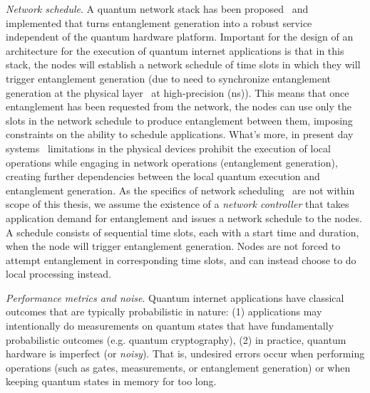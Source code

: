 \textit{Network schedule}.
A quantum network stack has been proposed~\cite{dahlberg2019link} and implemented \cite{pompili2022experimental} that turns entanglement generation into a robust service independent of the quantum hardware platform.
Important for the design of an architecture for the execution of quantum internet applications is that in this stack, the nodes will establish a network schedule of time slots in which they will trigger entanglement generation (due to need to synchronize entanglement generation at the physical layer~\cite{dahlberg2019link} at high-precision (ns)).
This means that once entanglement has been requested from the network, the nodes can use only the slots in the network schedule to produce entanglement between them, imposing constraints on the ability to schedule applications. What's more, in present day systems~\cite{pompili2021realization, krutyanskiy2023entanglement} limitations in the physical devices prohibit the execution of local operations while engaging in network operations (entanglement generation), creating further dependencies between the local quantum execution and entanglement generation. 
As the specifics of network scheduling~\cite{network-scheduling, skrzypczyk2021architecture} are not within scope of this thesis,
we assume the existence of a \textit{network controller} that takes application demand for entanglement and issues a network schedule to the nodes. 
A schedule consists of sequential time slots, each with a start time and duration, when the node will trigger entanglement generation.
Nodes are not forced to attempt entanglement in corresponding time slots, and can instead choose to do local processing instead.


\textit{Performance metrics and noise}. Quantum internet applications have classical outcomes that are typically probabilistic in nature:
(1) applications may intentionally do measurements on quantum states that have fundamentally probabilistic outcomes (e.g. quantum cryptography),
(2) in practice, quantum hardware is imperfect (or \textit{noisy}). That is, undesired errors occur
when performing operations (such as gates, measurements, or entanglement generation) or when keeping quantum states in memory for too long.


